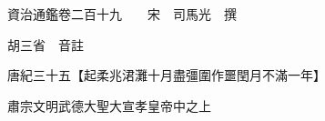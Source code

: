 










 


 
 


 

  
  
  
  
  





  
  
  
  
  
 
  

  

  
  
  



  

 
 

  
   




  

  
  


  　　資治通鑑卷二百十九　　宋　司馬光　撰

　　胡三省　音註

　　唐紀三十五【起柔兆涒灘十月盡彊圍作噩閏月不滿一年】

　　肅宗文明武德大聖大宣孝皇帝中之上


